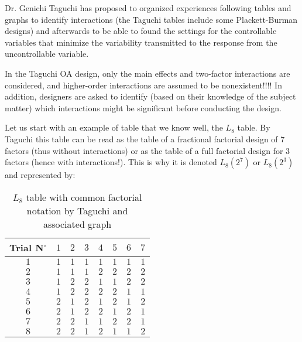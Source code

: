 	Dr. Genichi Taguchi has proposed to organized experiences following tables and graphs to identify interactions (the Taguchi tables include some Plackett-Burman designs) and afterwards to be able to found the settings for the controllable variables that minimize the variability transmitted to the response from the uncontrollable variable.
	
	In the Taguchi OA design, only the main effects and two-factor interactions are considered, and higher-order interactions are assumed to be nonexistent!!!! In addition, designers are asked to identify (based on their knowledge of the subject matter) which interactions might be significant before conducting the design.

	Let us start with an example of table that we know well, the $L_8$ table. By Taguchi this table can be read as the table of a fractional factorial design of $7$ factors (thus without interactions) or  as the table of a full factorial design for $3$ factors (hence with interactions!). This is why it is denoted $L_8(2^7)$ or $L_8(2^3)$ and represented by:
	\begin{table}[H]\centering
	\begin{center}
			\begin{tabular}{|c|c|c|c|c|c|c|c|}
				\hline
				\multicolumn{1}{c}{\cellcolor{black!30}\textbf{Trial N${}^\circ$}} & 
  \multicolumn{1}{c}{\cellcolor{black!30}$1$} & 
  \multicolumn{1}{c}{\cellcolor{black!30}$2$} & 
  \multicolumn{1}{c}{\cellcolor{black!30}$3$} & 
  \multicolumn{1}{c}{\cellcolor{black!30}$4$} & 
  \multicolumn{1}{c}{\cellcolor{black!30}$5$} & 
  \multicolumn{1}{c}{\cellcolor{black!30}$6$} & 
  \multicolumn{1}{c}{\cellcolor{black!30}$7$}\\ \hline
				 $1$ & $1$ & $1$ & $1$ & $1$ & $1$ & $1$ & $1$\\ \hline
				 $2$ & $1$ & $1$ & $1$ & $2$ & $2$ & $2$ & $2$\\ \hline
				$3$ & $1$ & $2$ & $2$ & $1$ & $1$ & $2$ & $2$\\ \hline
				$4$ & $1$ & $2$ & $2$ & $2$ & $2$ & $1$ & $1$\\ \hline
				$5$ & $2$ & $1$ & $2$ & $1$ & $2$ & $1$ & $2$\\ \hline
				$6$ & $2$ & $1$ & $2$ & $2$ & $1$ & $2$ & $1$\\ \hline
				$7$ & $2$ & $2$ & $1$ & $1$ & $2$ & $2$ & $1$\\ \hline
				$8$ & $2$ & $2$ & $1$ & $2$ & $1$ & $1$ & $2$\\ \hline
 		\end{tabular}
	\end{center}
	\caption{$L_8$ table with common factorial notation by Taguchi and associated graph}
	\end{table}
